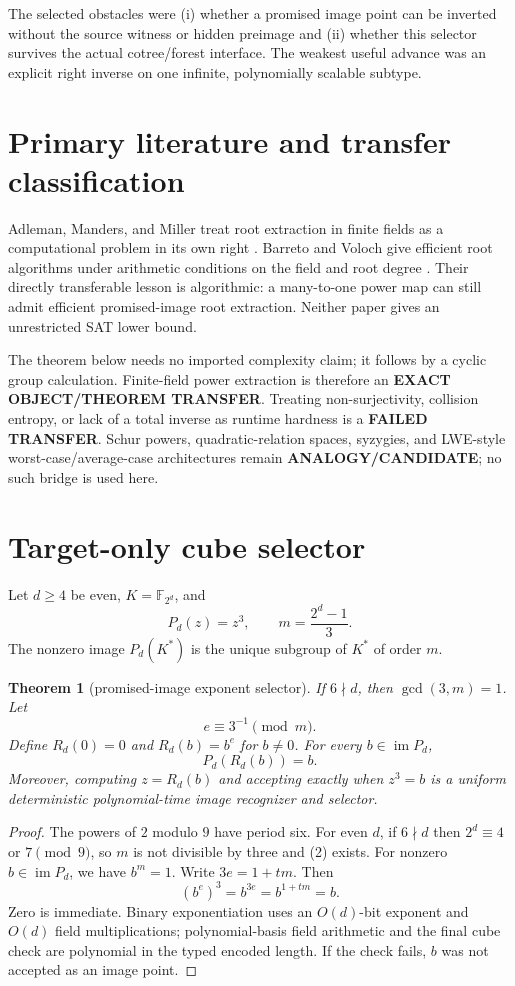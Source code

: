 \documentclass[11pt]{article}
\newtheorem{theorem}{Theorem}
\begin{document}
The selected obstacles were (i) whether a promised image point can be inverted
without the source witness or hidden preimage and (ii) whether this selector
survives the actual cotree/forest interface.  The weakest useful advance was
an explicit right inverse on one infinite, polynomially scalable subtype.

\section{Primary literature and transfer classification}
Adleman, Manders, and Miller treat root extraction in finite fields as a
computational problem in its own right \cite{AMM}.  Barreto and Voloch give
efficient root algorithms under arithmetic conditions on the field and root
degree \cite{BV}.  Their directly transferable lesson is algorithmic: a
many-to-one power map can still admit efficient promised-image root
extraction.  Neither paper gives an unrestricted SAT lower bound.

The theorem below needs no imported complexity claim; it follows by a cyclic
group calculation.  Finite-field power extraction is therefore an
\textbf{EXACT OBJECT/THEOREM TRANSFER}.  Treating non-surjectivity, collision
entropy, or lack of a total inverse as runtime hardness is a
\textbf{FAILED TRANSFER}.  Schur powers, quadratic-relation spaces, syzygies,
and LWE-style worst-case/average-case architectures remain
\textbf{ANALOGY/CANDIDATE}; no such bridge is used here.

\section{Target-only cube selector}
Let $d\ge4$ be even, $K=\mathbb F_{2^d}$, and
\[
 P_d(z)=z^3,\qquad m=\frac{2^d-1}{3}.                   \tag{1}
\]
The nonzero image $P_d(K^*)$ is the unique subgroup of $K^*$ of order $m$.

\begin{theorem}[promised-image exponent selector]
If $6\nmid d$, then $\gcd(3,m)=1$.  Let
\[
 e\equiv3^{-1}\pmod m.                                 \tag{2}
\]
Define $R_d(0)=0$ and $R_d(b)=b^e$ for $b\ne0$.  For every
$b\in\operatorname{im}P_d$,
\[
 P_d(R_d(b))=b.                                         \tag{3}
\]
Moreover, computing $z=R_d(b)$ and accepting exactly when $z^3=b$ is a
uniform deterministic polynomial-time image recognizer and selector.
\end{theorem}
\begin{proof}
The powers of $2$ modulo $9$ have period six.  For even $d$, if $6\nmid d$
then $2^d\equiv4$ or $7\pmod9$, so $m$ is not divisible by three and (2)
exists.  For nonzero $b\in\operatorname{im}P_d$, we have $b^m=1$.  Write
$3e=1+tm$.  Then
\[
 (b^e)^3=b^{3e}=b^{1+tm}=b.
\]
Zero is immediate.  Binary exponentiation uses an $O(d)$-bit exponent and
$O(d)$ field multiplications; polynomial-basis field arithmetic and the final
cube check are polynomial in the typed encoded length.  If the check fails,
$b$ was not accepted as an image point.
\end{proof}
\end{document}
